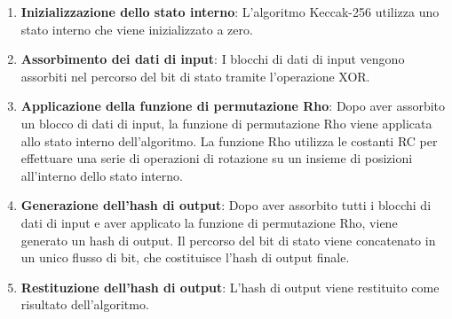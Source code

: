 \documentclass[a4paper,11pt]{report}
\begin{document}
\begin{enumerate}
    \item \textbf{Inizializzazione dello stato interno}: L'algoritmo Keccak-256 utilizza uno stato interno che viene inizializzato a zero.
    \item \textbf{Assorbimento dei dati di input}: I blocchi di dati di input vengono assorbiti nel percorso del bit di stato tramite l'operazione XOR.
    \item \textbf{Applicazione della funzione di permutazione Rho}: Dopo aver assorbito un blocco di dati di input, la funzione di permutazione Rho viene applicata allo stato interno dell'algoritmo. La funzione Rho utilizza le costanti RC per effettuare una serie di operazioni di rotazione su un insieme di posizioni all'interno dello stato interno.
    \item \textbf{Generazione dell'hash di output}: Dopo aver assorbito tutti i blocchi di dati di input e aver applicato la funzione di permutazione Rho, viene generato un hash di output. Il percorso del bit di stato viene concatenato in un unico flusso di bit, che costituisce l'hash di output finale.
    \item \textbf{Restituzione dell'hash di output}: L'hash di output viene restituito come risultato dell'algoritmo.
\end{enumerate}
\end{document}
